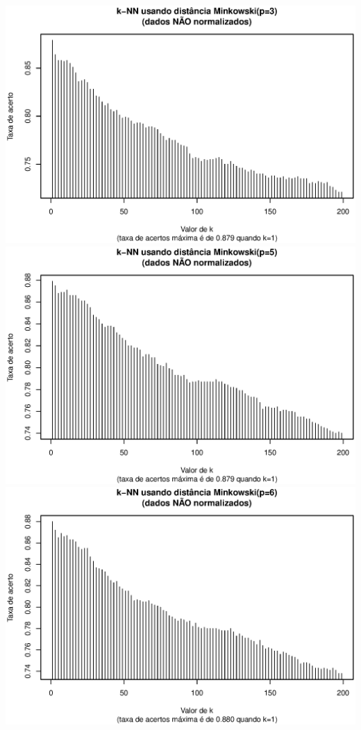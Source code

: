\documentclass[10pt,a4paper,twocolumn]{article}
\begin{document}
      \includegraphics[scale=0.33]{graficos/minkowski_3_0.ps}
      \includegraphics[scale=0.33]{graficos/minkowski_5_0.ps}
      \includegraphics[scale=0.33]{graficos/minkowski_6_0.ps}
\end{document}

